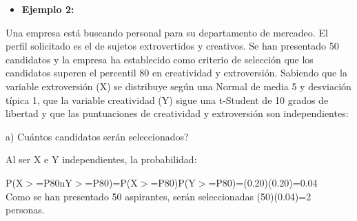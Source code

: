 \documentclass[12pt,letterpaper]{article}\usepackage[]{graphicx}\usepackage[]{color}
\begin{document}
\begin{itemize}
  \item \textbf{Ejemplo 2:}
\end{itemize}

Una empresa est\'a buscando personal para su departamento de mercadeo. El perfil solicitado es el de sujetos extrovertidos y creativos. Se han presentado 50 candidatos y la empresa ha establecido como criterio de selecci\'on que los candidatos superen el percentil 80 en creatividad y extroversi\'on. Sabiendo que la variable extroversi\'on (X) se distribuye seg\'un una Normal de media 5 y desviaci\'on t\'ipica 1, que la variable creatividad (Y) sigue una t-Student de 10 grados de libertad y que las puntuaciones de creatividad y extroversi\'on son independientes: 
\begin{description}
  \item a) \¿Cu\'antos candidatos ser\'an seleccionados?
  
Al ser X e Y independientes, la probabilidad:

P(X$>$=P80nY$>$=P80)=P(X$>$=P80)P(Y$>$=P80)=(0.20)(0.20)=0.04\\  
Como se han presentado 50 aspirantes, ser\'an seleccionadas (50)(0.04)=2 personas.
\end{description}
\end{document}
